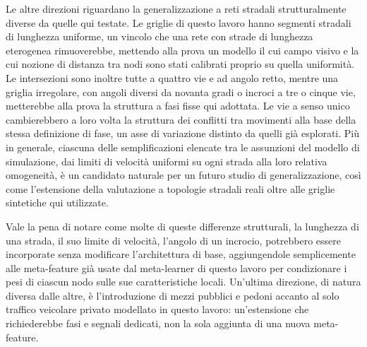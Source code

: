 Le altre direzioni riguardano la generalizzazione a reti stradali
strutturalmente diverse da quelle qui testate. Le griglie di questo lavoro
hanno segmenti stradali di lunghezza uniforme, un vincolo che una rete con
strade di lunghezza eterogenea rimuoverebbe, mettendo alla prova un
modello il cui campo visivo e la cui nozione di distanza tra nodi sono
stati calibrati proprio su quella uniformità. Le intersezioni sono inoltre
tutte a quattro vie e ad angolo retto, mentre una griglia irregolare, con
angoli diversi da novanta gradi o incroci a tre o cinque vie, metterebbe
alla prova la struttura a fasi fisse qui adottata. Le vie a senso unico
cambierebbero a loro volta la struttura dei conflitti tra movimenti alla
base della stessa definizione di fase, un asse di variazione distinto da
quelli già esplorati. Più in generale, ciascuna delle semplificazioni
elencate tra le assunzioni del modello di simulazione, dai limiti di
velocità uniformi su ogni strada alla loro relativa omogeneità, è un
candidato naturale per un futuro studio di generalizzazione, così come
l'estensione della valutazione a topologie stradali reali oltre alle
griglie sintetiche qui utilizzate.

Vale la pena di notare come molte di queste differenze strutturali, la
lunghezza di una strada, il suo limite di velocità, l'angolo di un
incrocio, potrebbero essere incorporate senza modificare l'architettura di
base, aggiungendole semplicemente alle meta-feature già usate dal
meta-learner di questo lavoro per condizionare i pesi di ciascun nodo
sulle sue caratteristiche locali. Un'ultima direzione, di natura diversa
dalle altre, è l'introduzione di mezzi pubblici e pedoni accanto al solo
traffico veicolare privato modellato in questo lavoro: un'estensione che
richiederebbe fasi e segnali dedicati, non la sola aggiunta di una nuova
meta-feature.

